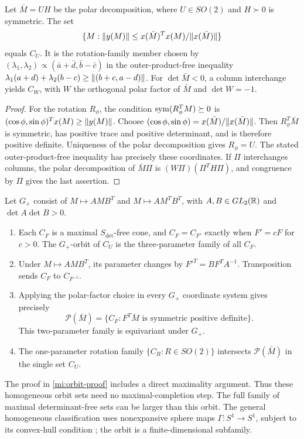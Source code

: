 \begin{proposition}\label{mi:polar}
Let $\bar M=UH$ be the polar decomposition, where $U\in SO(2)$ and
$H\succ0$ is symmetric. The set
\[
 \{M:\lVert y(M)\rVert\le x(\bar M)^Tx(M)/\lVert x(\bar M)\rVert\}
\]
equals $C_U$. It is the rotation-family member chosen by
$(\lambda_1,\lambda_2)\propto(\bar a+\bar d,\bar b-\bar c)$ in the
outer-product-free inequality
$\lambda_1(a+d)+\lambda_2(b-c)\ge\lVert(b+c,a-d)\rVert$.
For $\det\bar M<0$, a column interchange yields $C_W$, with $W$ the
orthogonal polar factor of $\bar M$ and $\det W=-1$.
\end{proposition}
\begin{proof}
For the rotation $R_\phi$, the condition
$\operatorname{sym}(R_\phi^TM)\succeq0$ is
$(\cos\phi,\sin\phi)^Tx(M)\ge\lVert y(M)\rVert$.
Choose $(\cos\phi,\sin\phi)=x(\bar M)/\lVert x(\bar M)\rVert$.
Then $R_\phi^T\bar M$ is symmetric, has positive trace and positive
determinant, and is therefore positive definite. Uniqueness of the polar
decomposition gives $R_\phi=U$. The stated outer-product-free inequality
has precisely these coordinates. If $\Pi$ interchanges columns, the polar
decomposition of $\bar M\Pi$ is
$(W\Pi)(\Pi^TH\Pi)$, and congruence by $\Pi$ gives the last assertion.
\end{proof}

\begin{proposition}\label{mi:orbit}
Let $G_+$ consist of $M\mapsto AMB^T$ and $M\mapsto AM^TB^T$, with
$A,B\in GL_2(\mathbb R)$ and $\det A\det B>0$.
\begin{enumerate}
\item Each $C_F$ is a maximal $S_{\det}$-free cone, and
$C_F=C_{F'}$ exactly when $F'=cF$ for $c>0$.
The $G_+$-orbit of $C_U$ is the three-parameter family of all $C_F$.
\item Under $M\mapsto AMB^T$, its parameter changes by
$F'^T=BF^TA^{-1}$. Transposition sends $C_F$ to $C_{F^{-1}}$.
\item Applying the polar-factor choice in every $G_+$ coordinate system
gives precisely
\[
 \mathcal P(\bar M)=\{C_F:F^T\bar M\text{ is symmetric positive definite}\}.
\]
This two-parameter family is equivariant under $G_+$.
\item The one-parameter rotation family $\{C_R:R\in SO(2)\}$ intersects
$\mathcal P(\bar M)$ in the single set $C_U$.
\end{enumerate}
\end{proposition}
\noindent
The proof in \cref{mi:orbit-proof} includes a direct maximality argument.
Thus these homogeneous orbit sets need no maximal-completion step.
The full family of maximal determinant-free sets can be larger than this orbit.
The general homogeneous classification uses nonexpansive sphere maps
$\Gamma:S^1\to S^1$, subject to its convex-hull condition
\citep{MPS2025}; the orbit is a finite-dimensional subfamily.


